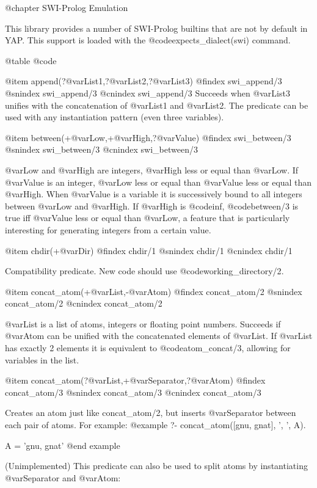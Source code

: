 @chapter SWI-Prolog Emulation

This library provides a number of SWI-Prolog builtins that are not by
default in YAP. This support is loaded with the
@code{expects_dialect(swi)} command.

@table @code

@item append(?@var{List1},?@var{List2},?@var{List3})
@findex swi_append/3
@snindex swi_append/3
@cnindex swi_append/3
Succeeds when @var{List3} unifies with the concatenation of @var{List1}
and @var{List2}. The predicate can be used with any instantiation
pattern (even three variables).

@item between(+@var{Low},+@var{High},?@var{Value})
@findex swi_between/3
@snindex swi_between/3
@cnindex swi_between/3

@var{Low} and @var{High} are integers, @var{High} less or equal than
@var{Low}. If @var{Value} is an integer, @var{Low} less or equal than
@var{Value} less or equal than @var{High}.  When @var{Value} is a
variable it is successively bound to all integers between @var{Low} and
@var{High}.  If @var{High} is @code{inf}, @code{between/3} is true iff
@var{Value} less or equal than @var{Low}, a feature that is particularly
interesting for generating integers from a certain value.

@item chdir(+@var{Dir})
@findex chdir/1
@snindex chdir/1
@cnindex chdir/1

Compatibility predicate.  New code should use @code{working_directory/2}.

@item concat_atom(+@var{List},-@var{Atom})
@findex concat_atom/2
@snindex concat_atom/2
@cnindex concat_atom/2

@var{List} is a list of atoms, integers or floating point numbers. Succeeds
if @var{Atom} can be unified with the concatenated elements of @var{List}. If
@var{List} has exactly 2 elements it is equivalent to @code{atom_concat/3},
allowing for variables in the list.

@item concat_atom(?@var{List},+@var{Separator},?@var{Atom})
@findex concat_atom/3
@snindex concat_atom/3
@cnindex concat_atom/3

Creates an atom just like concat_atom/2, but inserts @var{Separator}
between each pair of atoms.  For example:
@example
?- concat_atom([gnu, gnat], ', ', A).

A = 'gnu, gnat'
@end example

(Unimplemented) This predicate can also be used to split atoms by
instantiating @var{Separator} and @var{Atom}:

